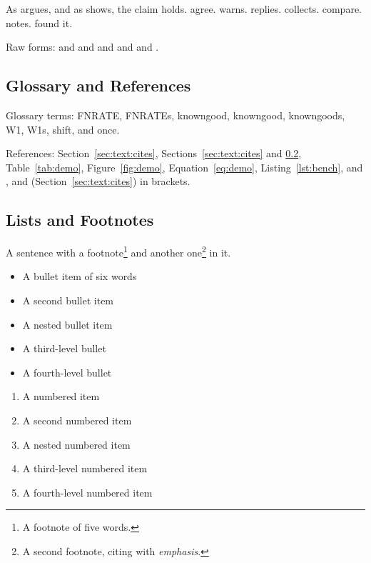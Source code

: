 As \citet{one} argues, and as \citet[p.~4]{two} shows, the claim holds.  agree.  warns.  replies.  collects.  compare.  notes.  found it.

Raw forms: \citet{one,two} and \citep{three} and \citeauthor{two} and \textcite{three} and \parencite[p.~9]{one} and .

\subsection{Glossary and References}
\label{sec:text:refs}

Glossary terms: \gls{FNRATE}, \glspl{FNRATE}, \gls{knowngood}, \Gls{knowngood}, \glspl{knowngood}, \gls{W1}, \glspl{W1}, \gls{shift}, and  once.

References: Section~\ref{sec:text:cites}, Sections~\ref{sec:text:cites} and \ref{sec:text:lists}, Table~\ref{tab:demo}, Figure~\ref{fig:demo}, Equation~\ref{eq:demo}, Listing~\ref{lst:bench},  and , and (Section~\ref{sec:text:cites}) in brackets.

\subsection{Lists and Footnotes}
\label{sec:text:lists}

A sentence with a footnote\footnote{A footnote of five words.} and another one\footnote{A second footnote, citing \citet{one} with \emph{emphasis}.} in it.

\begin{itemize}
\item A bullet item of six words
\item A second bullet item
	\item A nested bullet item
		\item A third-level bullet
			\item A fourth-level bullet
\end{itemize}

\begin{enumerate}
\item A numbered item
\item A second numbered item
	\item A nested numbered item
		\item A third-level numbered item
			\item A fourth-level numbered item
\end{enumerate}

